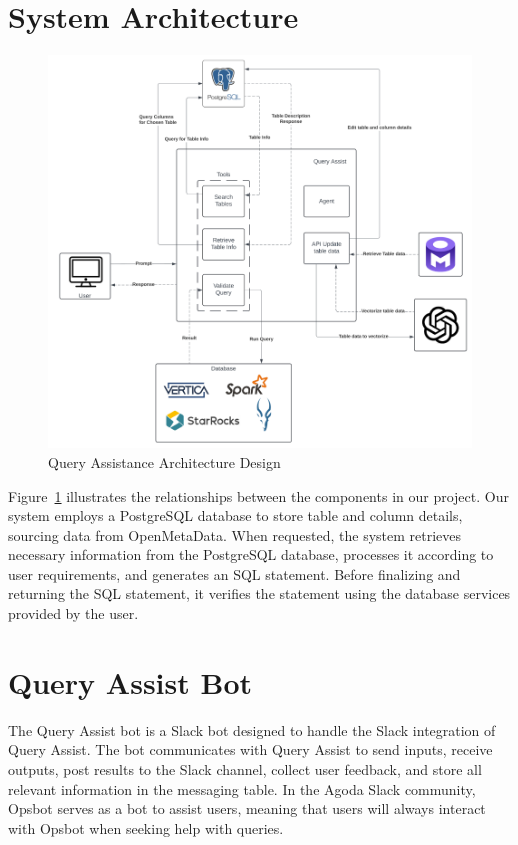 \section{System Architecture}
\begin{figure}[H]
    \centering
    \includegraphics[width=15cm]{chapters/3/figures/architecture.png}
    \caption[Query Assistance Architecture Design]{Query Assistance Architecture Design}
    \label{fig:query_assist_architecture_design}
\end{figure}
Figure~\ref{fig:query_assist_architecture_design} illustrates the relationships between the components in our project. Our system employs a PostgreSQL database to store table and column details, sourcing data from OpenMetaData. When requested, the system retrieves necessary information from the PostgreSQL database, processes it according to user requirements, and generates an SQL statement. Before finalizing and returning the SQL statement, it verifies the statement using the database services provided by the user.

\section{Query Assist Bot}
The Query Assist bot is a Slack bot designed to handle the Slack integration of Query Assist. The bot communicates with Query Assist to send inputs, receive outputs, post results to the Slack channel, collect user feedback, and store all relevant information in the messaging table. In the Agoda Slack community, Opsbot serves as a bot to assist users, meaning that users will always interact with Opsbot when seeking help with queries. 

